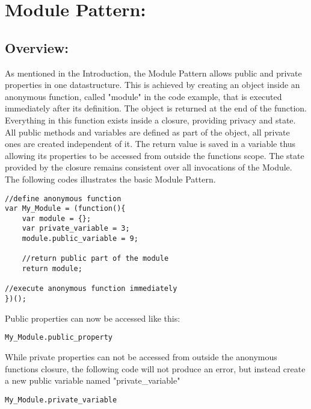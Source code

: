 \documentclass{bioinfo}
\begin{document}
\section{Module Pattern:}


\subsection{Overview:}
As mentioned in the Introduction, the Module Pattern allows public and private properties in one datastructure. This is achieved by creating an object inside an anonymous function, called "module" in the code example, that is executed immediately after its definition. The object is returned at the end of the function. Everything in this function exists inside a closure, providing privacy and state.  \\

All public methods and variables are defined as part of the object, all private ones are created independent of it. The return value is saved in a variable thus allowing its properties to be accessed from outside the functions scope. The state provided by the closure remains consistent over all invocations of the Module. The following codes illustrates the basic Module Pattern.

\vspace{\baselineskip}
\vspace{\baselineskip}
\vspace{\baselineskip}

\begin{lstlisting}
//define anonymous function
var My_Module = (function(){
	var module = {};
	var private_variable = 3;
	module.public_variable = 9;

	//return public part of the module
	return module;

//execute anonymous function immediately
})();
\end{lstlisting}

Public properties can now be accessed like this:

\begin{lstlisting}
My_Module.public_property
\end{lstlisting}


While private properties can not be accessed from outside the anonymous functions closure, the following code will not produce an error, but instead create a new public variable named "private\_variable"
\begin{lstlisting}
My_Module.private_variable
\end{lstlisting}
\end{document}
